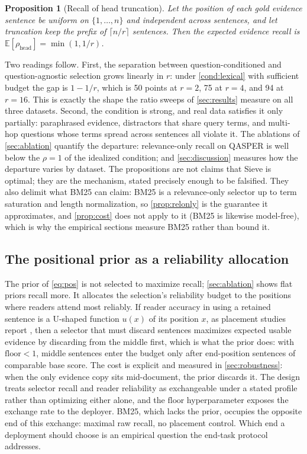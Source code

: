 \documentclass[preprint,12pt]{elsarticle}
\newtheorem{proposition}{Proposition}
\theoremstyle{remark}
\newcommand{\method}{Sieve}
\begin{document}
\begin{proposition}[Recall of head truncation]
\label{prop:head}
Let the position of each gold evidence sentence be uniform on
$\{1, \ldots, n\}$ and independent across sentences, and let
truncation keep the prefix of $\lceil n/r \rceil$ sentences. Then the
expected evidence recall is
$\mathbb{E}[\rho_{\mathrm{head}}] = \min(1, 1/r)$.
\end{proposition}

Two readings follow. First, the separation between question-conditioned
and question-agnostic selection grows linearly in $r$: under
\autoref{cond:lexical} with sufficient budget the gap is $1 - 1/r$,
which is 50 points at $r=2$, 75 at $r=4$, and 94 at $r=16$. This is
exactly the shape the ratio sweeps of \autoref{sec:results} measure on
all three datasets. Second, the condition is strong, and real data
satisfies it only partially: paraphrased evidence, distractors that
share query terms, and multi-hop questions whose terms spread across
sentences all violate it. The ablations of \autoref{sec:ablation}
quantify the departure: relevance-only recall on QASPER is well below
the $\rho = 1$ of the idealized condition; and \autoref{sec:discussion}
measures how the departure varies by dataset. The propositions are
not claims that \method{} is optimal; they are the mechanism, stated
precisely enough to be falsified. They also delimit what BM25 can
claim: BM25 is a relevance-only selector up to term saturation and
length normalization, so \autoref{prop:relonly} is the guarantee it
approximates, and \autoref{prop:cost} does not apply to it (BM25 is
likewise model-free), which is why the empirical sections measure BM25
rather than bound it.

\subsection{The positional prior as a reliability allocation}
The prior of \eqref{eq:pos} is not selected to maximize recall;
\autoref{sec:ablation} shows flat priors recall more. It allocates the
selection's reliability budget to the positions where readers attend
most reliably. If reader accuracy in using a retained sentence is a
U-shaped function $u(x)$ of its position $x$, as placement studies
report \citep{liu2023lost}, then a selector that must discard
sentences maximizes expected usable evidence by discarding from the
middle first, which is what the prior does: with
$\mathrm{floor} < 1$, middle sentences enter the budget only after
end-position sentences of comparable base score. The cost is explicit
and measured in \autoref{sec:robustness}: when the only evidence copy
sits mid-document, the prior discards it. The design treats selector
recall and reader reliability as exchangeable under a stated profile
rather than optimizing either alone, and the $\mathrm{floor}$
hyperparameter exposes the exchange rate to the deployer. BM25, which
lacks the prior, occupies the opposite end of this exchange: maximal
raw recall, no placement control. Which end a deployment should choose
is an empirical question the end-task protocol addresses.
\end{document}
